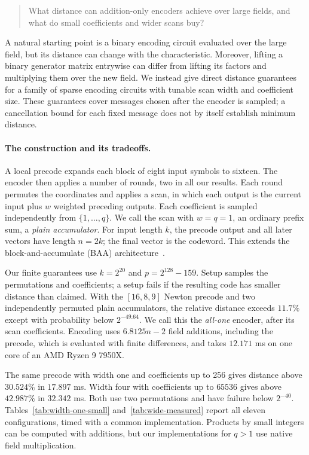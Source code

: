 \documentclass[runningheads,envcountsame,envcountsect]{llncs}
\begin{document}
\begin{quote}
What distance can addition-only encoders achieve over large fields,
and what do small coefficients and wider scans buy?
\end{quote}

A natural starting point is a binary encoding circuit evaluated over the
large field, but its distance can change with the characteristic.
Moreover, lifting a binary generator matrix entrywise can differ from
lifting its factors and multiplying them over the new field.
We instead give direct distance guarantees for a family of sparse
encoding circuits with tunable scan width and coefficient size. These
guarantees cover messages chosen after the encoder is sampled; a
cancellation bound for each fixed message does not by itself establish
minimum distance.

\paragraph{The construction and its tradeoffs.}
A local precode expands each block of eight input symbols to sixteen.
The encoder then applies a number of rounds, two in all our results.
Each round permutes the coordinates and applies a scan, in which each
output is the current input plus $w$ weighted preceding outputs. Each
coefficient is sampled independently from $\{1,\ldots,q\}$. We call the
scan with $w=q=1$, an ordinary prefix sum, a \emph{plain accumulator}.
For input length $k$, the precode output and all later vectors have
length $n=2k$; the final vector is the codeword. This extends the
block-and-accumulate (BAA) architecture~\cite{baa26}.

Our finite guarantees use $k=2^{20}$ and $p=2^{128}-159$. Setup samples
the permutations and coefficients; a setup fails if the resulting code
has smaller distance than claimed. With the $[16,8,9]$ Newton precode
and two independently permuted plain accumulators, the relative distance
exceeds $11.7\%$ except with probability below $2^{-49.64}$. We call this
the \emph{all-one} encoder, after its scan coefficients. Encoding uses
$6.8125n-2$ field additions, including the precode, which is evaluated
with finite differences, and takes $12.171$ ms on one core of an AMD
Ryzen 9 7950X.

The same precode with width one and coefficients up to 256 gives distance
above $30.524\%$ in $17.897$ ms. Width four with coefficients up to
$65536$ gives above $42.987\%$ in $32.342$ ms. Both use two permutations
and have failure below $2^{-40}$. Tables~\ref{tab:width-one-small}
and~\ref{tab:wide-measured} report all eleven configurations, timed with
a common implementation. Products by small integers can be computed with
additions, but our implementations for $q>1$ use native field
multiplication.
\end{document}
